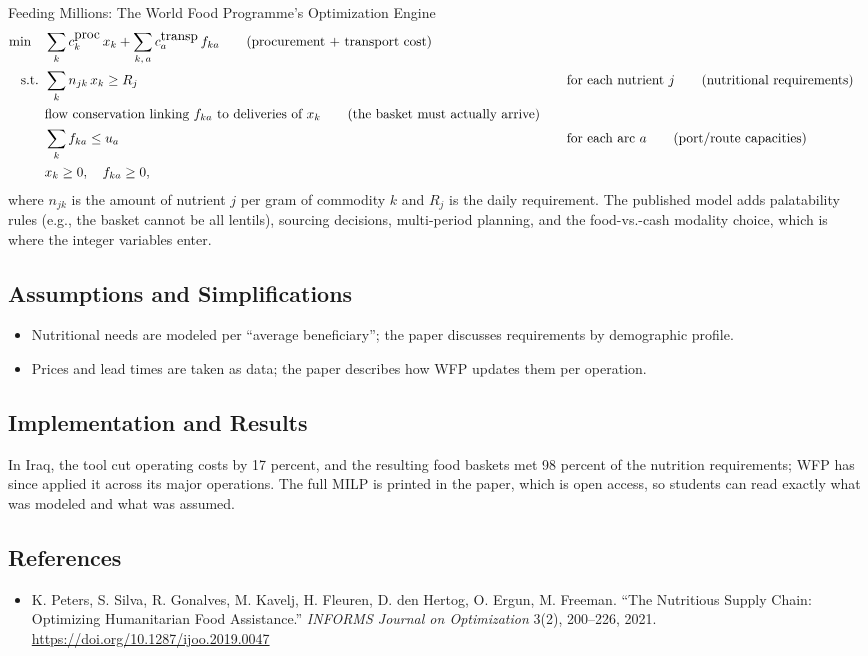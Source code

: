 \begin{casestudybox}{Feeding Millions: The World Food Programme's Optimization Engine}
\begin{align*}
\min \quad & \sum_{k} c^{\mbox{proc}}_k\, x_k + \sum_{k,\,a} c^{\mbox{transp}}_a\, f_{ka}   \tag{procurement + transport cost} \\
\mbox{ s.t. }        & \sum_{k} n_{jk} \, x_k \geq R_j &&\quad \mbox{for each nutrient } j   \tag{nutritional requirements} \\
           & \mbox{flow conservation linking } f_{ka} \mbox{ to deliveries of } x_k   \tag{the basket must actually arrive} \\
           & \sum_{k} f_{ka} \leq u_a &&\quad \mbox{for each arc } a   \tag{port/route capacities} \\
           & x_k \geq 0, \quad f_{ka} \geq 0,
\end{align*}
where $n_{jk}$ is the amount of nutrient $j$ per gram of commodity $k$ and $R_j$ is the daily requirement.  The published model adds palatability rules (e.g., the basket cannot be all lentils), sourcing decisions, multi-period planning, and the food-vs.-cash modality choice, which is where the integer variables enter.

\subsection*{Assumptions and Simplifications}
\begin{itemize}
\item Nutritional needs are modeled per ``average beneficiary''; the paper discusses requirements by demographic profile.
\item Prices and lead times are taken as data; the paper describes how WFP updates them per operation.
\end{itemize}

\subsection*{Implementation and Results}
In Iraq, the tool cut operating costs by 17 percent, and the resulting food baskets met 98 percent of the nutrition requirements; WFP has since applied it across its major operations.  The full MILP is printed in the paper, which is open access, so students can read exactly what was modeled and what was assumed.

\subsection*{References}
\begin{itemize}
\item K. Peters, S. Silva, R. Gonalves, M. Kavelj, H. Fleuren, D. den Hertog, O. Ergun, M. Freeman. ``The Nutritious Supply Chain: Optimizing Humanitarian Food Assistance.'' \emph{INFORMS Journal on Optimization} 3(2), 200--226, 2021. \url{https://doi.org/10.1287/ijoo.2019.0047}
\end{itemize}
\end{casestudybox}

